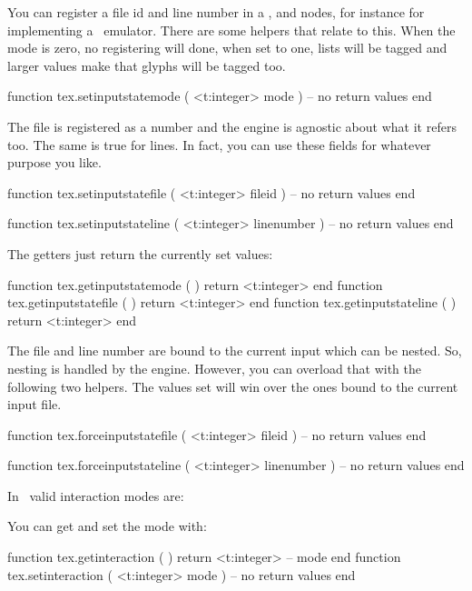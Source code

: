 \stopsubsection

\startsubsection[title=Files and lines]

You can register a file id and line number in a ,  and
 nodes, for instance for implementing a \SYNCTEX\ emulator. There are
some helpers that relate to this. When the mode is zero, no registering will
done, when set to one, lists will be tagged and larger values make that glyphs
will be tagged too.

\starttyping[option=LUA]
function tex.setinputstatemode ( <t:integer> mode )
    -- no return values
end
\stoptyping

The file is registered as a number and the engine is agnostic about what it
refers too. The same is true for lines. In fact, you can use these fields
for whatever purpose you like.

\starttyping[option=LUA]
function tex.setinputstatefile ( <t:integer> fileid )
    -- no return values
end

function tex.setinputstateline ( <t:integer> linenumber )
    -- no return values
end
\stoptyping

The getters just return the currently set values:

\starttyping[option=LUA]
function tex.getinputstatemode ( ) return <t:integer> end
function tex.getinputstatefile ( ) return <t:integer> end
function tex.getinputstateline ( ) return <t:integer> end
\stoptyping

The file and line number are bound to the current input which can be nested. So,
nesting is handled by the engine. However, you can overload that with the
following two helpers. The values set will win over the ones bound to the current
input file.

\starttyping[option=LUA]
function tex.forceinputstatefile ( <t:integer> fileid )
    -- no return values
end

function tex.forceinputstateline ( <t:integer> linenumber )
    -- no return values
end
\stoptyping

\stopsubsection

\startsubsection[title=Interacting]

In \LUAMETATEX\ valid interaction modes are:

\starttworows
{}
\stoptworows

You can get and set the mode with:

\starttyping[option=LUA]
function tex.getinteraction ( )
    return <t:integer> -- mode
end
function tex.setinteraction ( <t:integer> mode )
    -- no return values
end
\stoptyping

